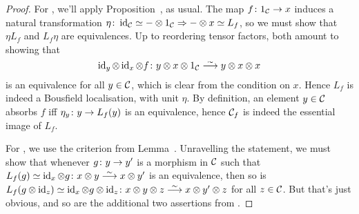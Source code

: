 \begin{proof}
	For , we'll apply Proposition~, as usual. The map $f\colon 1_\Cc\morphism x$ induces a natural transformation $\eta\colon \operatorname{id}_{\mathcal{C}}\simeq -\otimes 1_{\mathcal{C}} \Rightarrow -\otimes x\simeq L_f$, so we must show that $\eta L_f$ and $L_f\eta$ are equivalences. Up to reordering tensor factors, both amount to showing that
	\begin{equation*}
		\id_y\otimes \id_x\otimes f\colon y\otimes x\otimes 1_\Cc\isomorphism y\otimes x\otimes x
	\end{equation*}
	is an equivalence for all $y\in \mathcal{C}$, which is clear from the condition on $x$. Hence $L_f$ is indeed a Bousfield localisation, with unit $\eta$. By definition, an element $y\in \mathcal{C}$ absorbs $f$ iff $\eta_y\colon y\morphism L_f(y)$ is an equivalence, hence $\mathcal{C}_f$ is indeed the essential image of $L_f$.
	
	For , we use the criterion from Lemma~. Unravelling the statement, we must show that whenever $g\colon y\morphism y'$ is a morphism in $\mathcal{C}$ such that $L_f(g)\simeq \id_x\otimes g\colon x\otimes y\isomorphism x\otimes y'$ is an equivalence, then so is $L_f(g\otimes \id_z)\simeq \id_x\otimes g\otimes \id_z\colon x\otimes y\otimes z\isomorphism x\otimes y'\otimes z$ for all $z\in \mathcal{C}$. But that's just obvious, and so are the additional two assertions from .
	

\end{proof}
